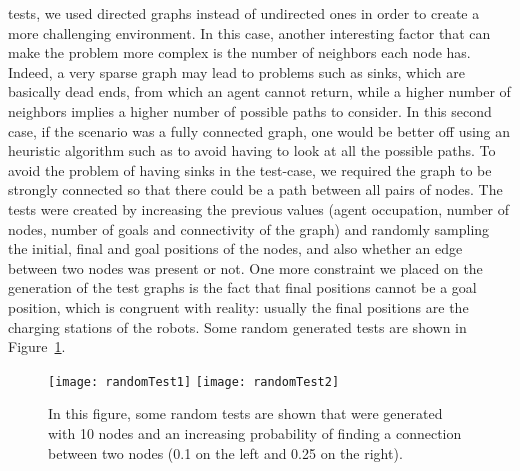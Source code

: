 tests, we used directed graphs instead of undirected ones in order to create a
more challenging environment. In this case, another interesting factor that can
make the  problem more complex is the number of neighbors each node
has. Indeed, a very sparse graph may lead to problems such as sinks, which are
basically dead ends, from which an agent cannot return, while a higher number
of neighbors implies a higher number of possible paths to consider. In this
second case, if the scenario was a fully connected graph, one would be better
off using an heuristic algorithm such as \astar to avoid having to look at all
the possible paths. To avoid the problem of having sinks in the test-case, we
required the graph to be strongly connected so that there could be a path
between all pairs of nodes. \newline
The tests were created by increasing the previous values (agent occupation,
number of nodes, number of goals and connectivity of the graph) and randomly
sampling the initial, final and goal positions of the nodes, and also whether
an edge between two nodes was present or not. \newline
One more constraint we placed on the generation of the test graphs is the fact
that final positions cannot be a goal position, which is congruent with 
reality: usually the final positions are the charging stations of the robots.
Some random generated tests are shown in Figure~\ref{fig:randomTests}.
\begin{figure}[tb]
  \centering
  \texttt{[image: randomTest1]}
  \hfill
  \texttt{[image: randomTest2]}
  \caption{In this figure, some random tests are shown that were generated with
  10 nodes and an increasing probability of finding a connection between two
  nodes (0.1 on the left and 0.25 on the right).}
  \label{fig:randomTests}
\end{figure}
%
%
